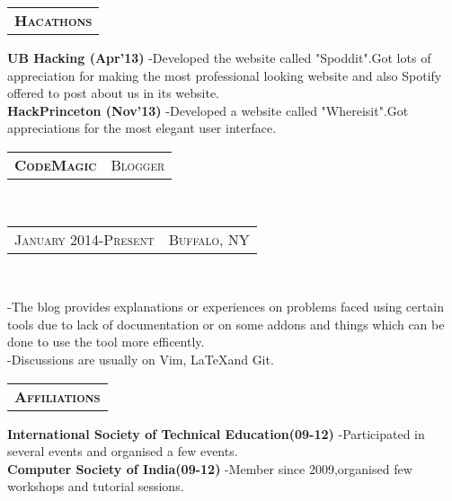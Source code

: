 \documentclass[10pt,a4paper,oneside]{article}
\begin{document}
\begin{minipage}[t]{0.33\textwidth}
        \vspace{10pt}
        \begin{tabular}{c}
        \textbf{\normalsize H\textsc{acathons}}\\
        \end{tabular}
        \begin{adjustwidth}{7pt}{0pt}
            {\footnotesize \textbf{UB Hacking (Apr'13)} -Developed the website called "Spoddit".Got lots of appreciation for 
            making the most professional looking website and also Spotify offered to post about us in its website.}\\
            {\footnotesize \textbf{HackPrinceton (Nov'13)} -Developed a website called "Whereisit".Got appreciations for the
            most elegant user interface.}
            \vspace{0pt}\\
        \end{adjustwidth}
        \begin{tabular}{c|c}
            \textbf{\normalsize C\textsc{ode}M\textsc{agic}}
            &\textmd{\normalsize B\textsc{logger}}
        \end{tabular}\\
        \textcolor{light-gray}{
            \begin{tabular}{c|c}
                {\small J\textsc{anuary 2014}-P\textsc{resent}}
                &{\small B\textsc{uffalo}, NY}
            \end{tabular}
        }\\ 
        \vspace{-4mm}
        \begin{adjustwidth}{7pt}{0pt}
            {\footnotesize -The blog provides explanations or experiences on problems faced using certain tools due to lack
            of documentation or on some addons and things which can be done to use the tool more efficently.}\\
            {\footnotesize -Discussions are usually on Vim, \LaTeX and Git. }
        \end{adjustwidth}
        \vspace{10pt}
        \begin{tabular}{c}
        \textbf{\normalsize A\textsc{ffiliations}}\\
        \end{tabular}
        \begin{adjustwidth}{7pt}{0pt}
            {\footnotesize \textbf{International Society of Technical Education(09-12)} -Participated in several events and
            organised a few events.}\\
            {\footnotesize \textbf{Computer Society of India(09-12)} -Member since 2009,organised few workshops and
        tutorial sessions.}
            \vspace{0pt}\\
        \end{adjustwidth} 
    \end{minipage}
\end{document}
